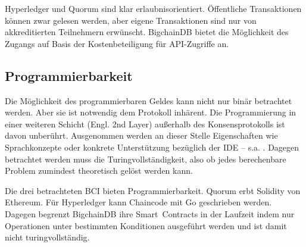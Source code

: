 Hyperledger und Quorum sind klar erlaubnisorientiert.
Öffentliche Transaktionen können zwar gelesen werden, aber eigene Transaktionen sind nur von akkreditierten Teilnehmern erwünscht.
BigchainDB bietet die Möglichkeit des Zugangs auf Basis der Kostenbeteiligung für API-Zugriffe an.

\subsection{Programmierbarkeit}\label{krit:programmierbarkeit}

Die Möglichkeit des programmierbaren Geldes kann nicht nur binär betrachtet werden.
Aber sie ist notwendig dem Protokoll inhärent.
Die Programmierung in einer weiteren Schicht (Engl. 2nd Layer) außerhalb des Konsensprotokolls ist davon unberührt.
Ausgenommen werden an dieser Stelle Eigenschaften wie Sprachkonzepte oder konkrete Unterstützung bezüglich der \gls{IDE} -- s.a. .
Dagegen betrachtet werden muss die Turingvollständigkeit, also ob jedes berechenbare Problem zumindest theoretisch gelöst werden kann.  

Die drei betrachteten \gls{BCI} bieten Programmierbarkeit.
Quorum erbt \ua{} Solidity von Ethereum.
Für Hyperledger kann Chaincode \ua{} mit Go geschrieben werden.
Dagegen begrenzt BigchainDB ihre Smart~Contracts in der Laufzeit indem nur Operationen unter bestimmten Konditionen ausgeführt werden und ist damit nicht turingvollständig. 






